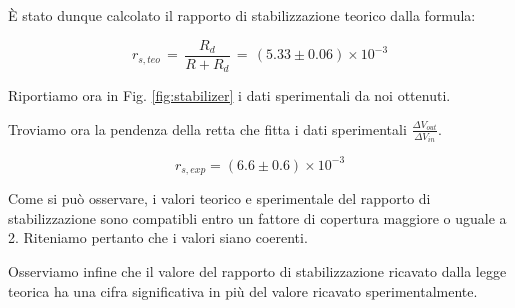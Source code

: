 È stato dunque calcolato il rapporto di stabilizzazione teorico dalla formula: 

\begin{equation}
r_{s,teo}\,=\,\frac{R_d}{R+R_d}\,=\, (5.33 \pm 0.06) \times 10^{-3}
\label{RS_teo}
\end{equation}

Riportiamo ora in Fig. \ref{fig:stabilizer} i dati sperimentali da noi ottenuti.

Troviamo ora la pendenza della retta che fitta i dati sperimentali $\frac{\Delta V_{out}}{\Delta V_{in}}$.

$$r_{s,exp}= (6.6 \pm 0.6) \times 10^{-3} $$

Come si può osservare, i valori teorico e sperimentale del rapporto di stabilizzazione sono compatibli entro un fattore di copertura maggiore o uguale a 2. Riteniamo pertanto che i valori siano coerenti.

Osserviamo infine che il valore del rapporto di stabilizzazione ricavato dalla legge teorica ha una cifra significativa in più del valore ricavato sperimentalmente.